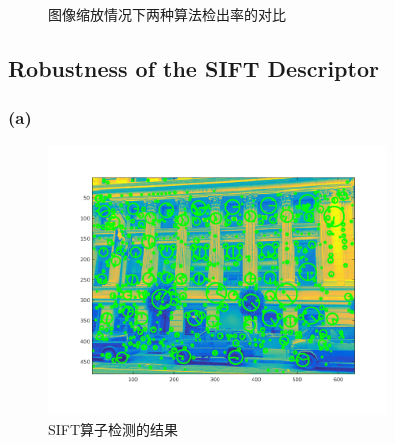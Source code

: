 \documentclass[a4paper, UTF8]{ctexrep}
\begin{document}
				\begin{figure}[htbp!]
					\centering
					\caption{图像缩放情况下两种算法检出率的对比}
				\end{figure}
			\clearpage
		\subsection{Robustness of the SIFT Descriptor}
			\subsubsection{(a)}
				\begin{figure}[htbp!]
					\centering
					\includegraphics[width=0.8\textwidth]{hw1_fig15.png}
					\caption{SIFT算子检测的结果}
				\end{figure}
			\clearpage
\end{document}
